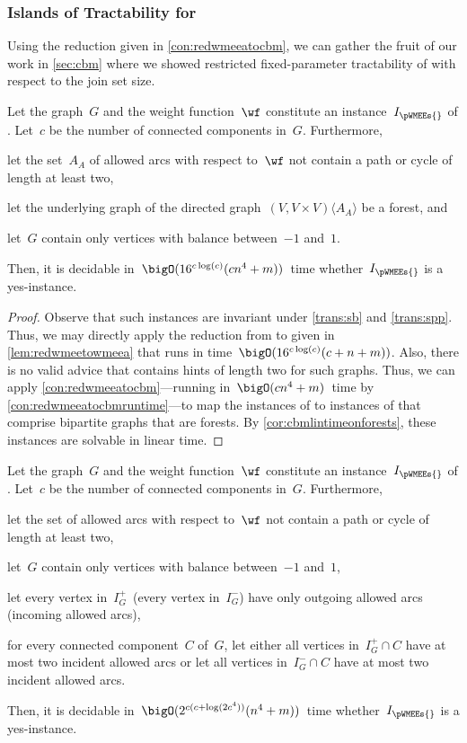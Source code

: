 \subsubsection{Islands of Tractability for  \pWMEEs}\label{sec:tractislands}
Using the reduction given in \autoref{con:redwmeeatocbm}, we can gather the fruit of our work in \autoref{sec:cbm} where we showed restricted fixed-parameter tractability of \pCBMs{} with respect to the join set size.
\begin{corollary}\label{cor:wmeetractableforests}
  Let the graph~$G$ and the weight function~$\wf$ constitute an instance~$I_\pWMEEs{}$ of \pWMEEs{}. Let~$c$ be the number of connected components in~$G$. Furthermore, 
\begin{lemenum}
\item let the set~$A_A$ of allowed arcs with respect to~$\wf$ not contain a path or cycle of length at least two,
\item let the underlying graph of the directed graph~$(V, V \times V)\langle A_A \rangle$ be a forest, and
\item let~$G$ contain only vertices with balance between~$-1$ and~$1$.
\end{lemenum}
Then, it is decidable in~$\bigO(16^{c\log(c)}(cn^4 + m))$~time whether~$I_\pWMEEs{}$ is a yes-instance.
\end{corollary}
\begin{proof}
  Observe that such instances are invariant under \autoref{trans:sb} and \autoref{trans:spp}. Thus, we may directly apply the reduction from \pWMEEs{} to \pWMEECAs{} given in \autoref{lem:redwmeetowmeea} that runs in time~$\bigO(16^{c\log(c)}(c + n + m))$. Also, there is no valid advice that contains hints of length two for such graphs. Thus, we can apply \autoref{con:redwmeeatocbm}---running in~$\bigO(cn^4 + m)$~time by \autoref{con:redwmeeatocbmruntime}---to map the instances of \pWMEECAs{} to instances of \pCBMs{} that comprise bipartite graphs that are forests. By \autoref{cor:cbmlintimeonforests}, these instances are solvable in linear time.
\end{proof}
\begin{corollary}\label{cor:wmeetractablecycles}

  Let the graph~$G$ and the weight function~$\wf$ constitute an instance~$I_\pWMEEs{}$ of \pWMEEs{}. Let~$c$ be the number of connected components in~$G$. Furthermore, 
\begin{lemenum}
\item let the set of allowed arcs with respect to~$\wf$ not contain a path or cycle of length at least two,
\item let~$G$ contain only vertices with balance between~$-1$ and~$1$,
\item let every vertex in~$I_G^+$~(every vertex in~$I_G^-$) have only outgoing allowed arcs (incoming allowed arcs),
\item for every connected component~$C$ of~$G$, let either all vertices in~$I_G^+ \cap C$ have at most two incident allowed arcs or let all vertices in~$I_G^- \cap C$ have at most two incident allowed arcs.
\end{lemenum}
Then, it is decidable in~$\bigO(2^{c(c + \log(2c^4))}(n^4 + m))$~time whether~$I_\pWMEEs{}$ is a yes-instance.
\end{corollary}
